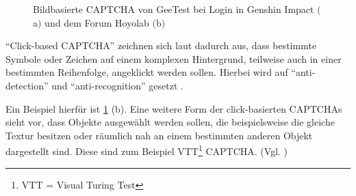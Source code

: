 \begin{figure}[h!]
    \centering
    \qquad
    \caption{Bildbasierte CAPTCHA von GeeTest bei Login in Genshin Impact $($a$)$ und dem Forum Hoyolab $($b$)$}   
    \label{fig:genshin}
\end{figure}

``Click-based CAPTCHA'' zeichnen sich laut \citeauthor{surveyofresearch} dadurch aus, dass bestimmte Symbole oder Zeichen auf einem komplexen Hinter\-grund, 
teilweise auch in einer bestimmten Reihenfolge, angeklickt werden sollen.
Hierbei wird auf ``anti-detection'' und ``anti-recognition'' gesetzt \cite[p.77]{surveyofresearch}. 

Ein Beispiel hierfür ist \ref{fig:genshin} (b).
Eine weitere Form der click-basierten CAPTCHAs sieht vor, dass Objekte ausgewählt werden sollen,
die beispielsweise die gleiche Textur besitzen oder räumlich nah an einem bestimmten anderen Objekt dargestellt sind. 
Diese sind zum Beispiel VTT\footnote[2]{VTT = Visual Turing Test} CAPTCHA. (Vgl. \cite[p.78]{surveyofresearch})

